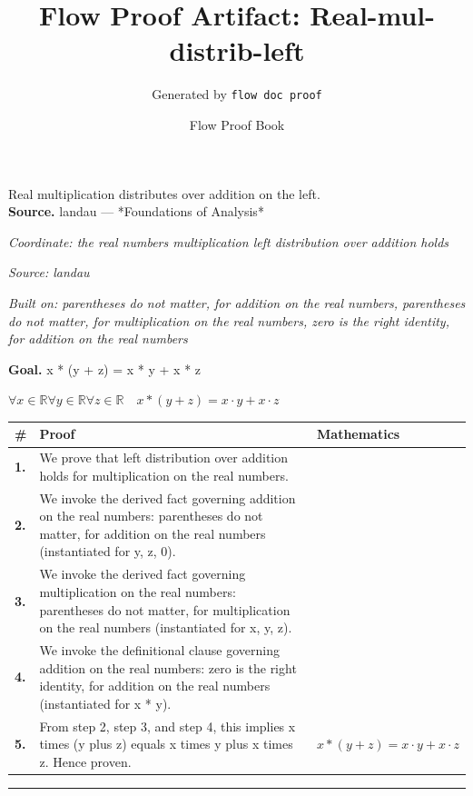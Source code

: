 \documentclass[11pt]{article}
\title{Flow Proof Artifact: Real-mul-distrib-left}
\author{Generated by \texttt{flow doc proof}}
\date{Flow Proof Book}
\theoremstyle{definition}
\begin{document}
\maketitle
Real multiplication distributes over addition on the left.\\[0.5em]
\textbf{Source.} landau — *Foundations of Analysis*\\[0.5em]
\bigskip
{}\par
\smallskip\noindent\textit{Coordinate: the real numbers \cdot multiplication \cdot left distribution over addition holds}\par
\smallskip\noindent\textit{Source: landau}\par
\smallskip\noindent\textit{Built on: parentheses do not matter, for addition on the real numbers, parentheses do not matter, for multiplication on the real numbers, zero is the right identity, for addition on the real numbers}\par
\medskip
\noindent\textbf{Goal.} x * (y + z) = x * y + x * z\par
\noindent$\displaystyle \forall x \in \mathbb{R} \forall y \in \mathbb{R} \forall z \in \mathbb{R}\quad x * (y + z) = x \cdot y + x \cdot z$\par
\medskip
\noindent
\begin{tabular}{@{} >{\raggedright\arraybackslash}p{} >{\raggedright\arraybackslash}p{} >{\raggedleft\arraybackslash}p{} @{}}
\textbf{\#} & \textbf{Proof} & \textbf{Mathematics} \\
\midrule
\textbf{1.} & We prove that left distribution over addition holds for multiplication on the real numbers. & \\[0.45em]
\textbf{2.} & We invoke the derived fact governing addition on the real numbers: parentheses do not matter, for addition on the real numbers (instantiated for y, z, 0). & \\[0.45em]
\textbf{3.} & We invoke the derived fact governing multiplication on the real numbers: parentheses do not matter, for multiplication on the real numbers (instantiated for x, y, z). & \\[0.45em]
\textbf{4.} & We invoke the definitional clause governing addition on the real numbers: zero is the right identity, for addition on the real numbers (instantiated for x * y). & \\[0.45em]
\textbf{5.} & From step 2, step 3, and step 4, this implies x times (y plus z) equals x times y plus x times z. Hence proven. & $\displaystyle x * (y + z) = x \cdot y + x \cdot z$ \\[0.45em]
\bottomrule
\end{tabular}
\label{thm:Real-multiplication-left_distribution_over_addition_holds}
\par\medskip\hrule
\end{document}
